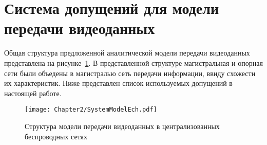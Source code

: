 \section{Система допущений для модели передачи видеоданных}
\label{chap2:Assumptions}

Общая структура предложенной аналитической модели передачи видеоданных представлена на рисунке~\ref{fig:SystemModel}. В представленной структуре магистральная и опорная сети были объедены в магистралью сеть передачи информации, ввиду схожести их характеристик. Ниже представлен список используемых допущений в настоящей работе.

\begin{figure}[htbp]
\begin{center}
\texttt{[image: Chapter2/SystemModelEch.pdf]}
\caption{Структура модели передачи видеоданных в централизованных беспроводных сетях}
\label{fig:SystemModel}
\end{center}
\end{figure}

